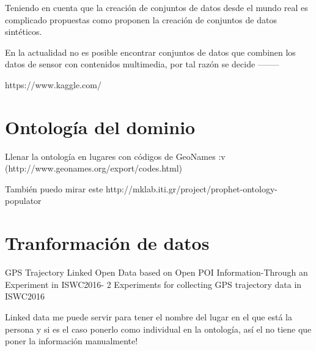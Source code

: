 Teniendo en cuenta que la creación de conjuntos de datos desde el mundo real es complicado propuestas como \cite{} proponen la creación de conjuntos de datos sintéticos. 

En la actualidad no es posible encontrar conjuntos de datos que combinen los datos de sensor con contenidos multimedia, por tal razón se decide --------

https://www.kaggle.com/

\section{Ontología del dominio}
\label{sec:CS_Ont_Dominio}

Llenar la ontología en lugares con códigos de GeoNames :v  (http://www.geonames.org/export/codes.html)

También puedo mirar este http://mklab.iti.gr/project/prophet-ontology-populator

\section{Tranformación de datos}

GPS Trajectory Linked Open Data based on Open POI Information-Through an Experiment in ISWC2016- 2 Experiments for collecting GPS trajectory data in ISWC2016

Linked data me puede servir para tener el nombre del lugar en el que está la persona y si es el caso ponerlo como individual en la ontología, así el no tiene que poner la información manualmente!